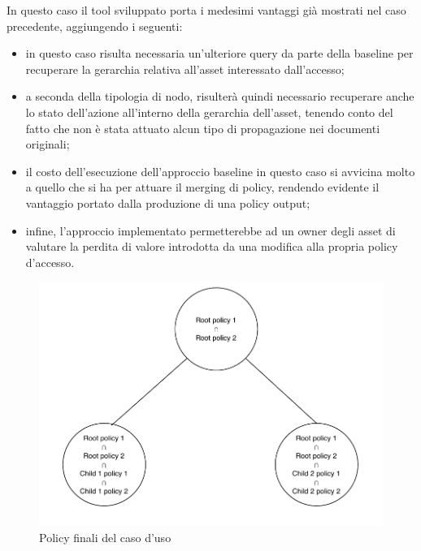 \documentclass[12pt,a4paper,twoside]{book}
\begin{document}
In questo caso il tool sviluppato porta i medesimi vantaggi già mostrati nel caso precedente, aggiungendo i seguenti:
\begin{itemize}
\item in questo caso risulta necessaria un'ulteriore query da parte della baseline per recuperare la gerarchia relativa all'asset interessato dall'accesso;
\item a seconda della tipologia di nodo, risulterà quindi necessario recuperare anche lo stato dell'azione all'interno della gerarchia dell'asset, tenendo conto del fatto che non è stata attuato alcun tipo di propagazione nei documenti originali;
\item il costo dell'esecuzione dell'approccio baseline in questo caso si avvicina molto a quello che si ha per attuare il merging di policy, rendendo evidente il vantaggio portato dalla produzione di una policy output;
\item infine, l'approccio implementato permetterebbe ad un owner degli asset di valutare la perdita di valore introdotta da una modifica alla propria policy d'accesso.
\end{itemize}
\begin{figure}[H]
\centering
\includegraphics[scale=.50]{../immagini/treePolicyExample.pdf}
\caption{Policy finali del caso d'uso}
\label{treeExampleImg}
\end{figure}
\end{document}
